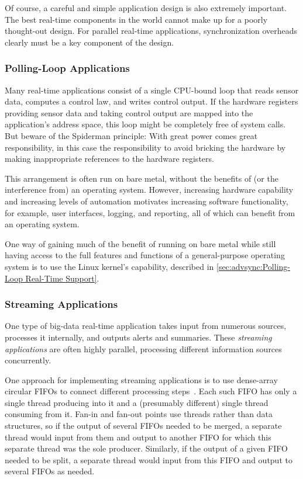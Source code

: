 Of course, a careful and simple application design is also extremely
important.
The best real-time components in the world cannot make up for a
poorly thought-out design.
For parallel real-time applications, synchronization overheads clearly
must be a key component of the design.

\subsubsection{Polling-Loop Applications}
\label{sec:advsync:Polling-Loop Applications}

Many real-time applications consist of a single CPU-bound loop that
reads sensor data, computes a control law, and writes control output.
If the hardware registers providing sensor data and taking control
output are mapped into the application's address space, this loop
might be completely free of system calls.
But beware of the Spiderman principle: With great power comes great
responsibility, in this case the responsibility to avoid bricking the
hardware by making inappropriate references to the hardware registers.

This arrangement is often run on bare metal, without the benefits of
(or the interference from) an operating system.
However, increasing hardware capability and increasing levels of
automation motivates increasing software functionality, for example,
user interfaces, logging, and reporting, all of which can benefit from
an operating system.

One way of gaining much of the benefit of running on bare metal while
still having access to the full features and functions of a
general-purpose operating system is to use the Linux kernel's
 capability, described in
\cref{sec:advsync:Polling-Loop Real-Time Support}.

\subsubsection{Streaming Applications}
\label{sec:advsync:Streaming Applications}

One type of big-data real-time application takes input from numerous
sources, processes it internally, and outputs alerts and summaries.
These \emph{streaming applications} are often highly parallel, processing
different information sources concurrently.

One approach for implementing streaming applications is to use
dense-array circular FIFOs to connect different processing
steps~\cite{AdrianSutton2013LCA:Disruptor}.
Each such FIFO has only a single thread producing into it and a
(presumably different) single thread consuming from it.
Fan-in and fan-out points use threads rather than data structures,
so if the output of several FIFOs needed to be merged, a separate
thread would input from them and output to another FIFO for which
this separate thread was the sole producer.
Similarly, if the output of a given FIFO needed to be split, a separate
thread would input from this FIFO and output to several FIFOs as needed.

